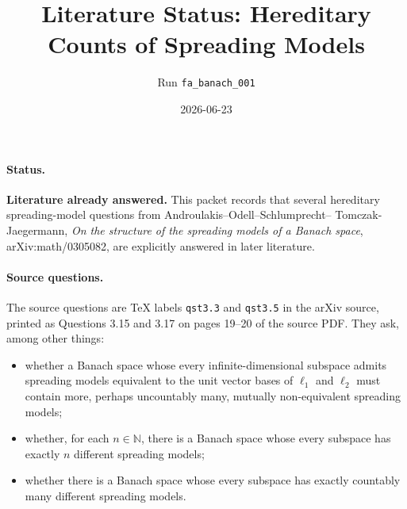 \documentclass[11pt]{article}
\title{Literature Status: Hereditary Counts of Spreading Models}
\author{Run \texttt{fa\_banach\_001}}
\date{2026-06-23}
\begin{document}
\sloppy
\maketitle

\paragraph{Status.}
\textbf{Literature already answered.} This packet records that several
hereditary spreading-model questions from Androulakis--Odell--Schlumprecht--
Tomczak-Jaegermann, \emph{On the structure of the spreading models of a
Banach space}, arXiv:math/0305082, are explicitly answered in later
literature.

\paragraph{Source questions.}
The source questions are TeX labels \texttt{qst3.3} and \texttt{qst3.5} in
the arXiv source, printed as Questions 3.15 and 3.17 on pages 19--20 of the
source PDF. They ask, among other things:
\begin{itemize}
\item whether a Banach space whose every infinite-dimensional subspace admits
spreading models equivalent to the unit vector bases of \(\ell_1\) and
\(\ell_2\) must contain more, perhaps uncountably many, mutually
non-equivalent spreading models;
\item whether, for each \(n\in\mathbb N\), there is a Banach space whose every
subspace has exactly \(n\) different spreading models;
\item whether there is a Banach space whose every subspace has exactly
countably many different spreading models.
\end{itemize}
\end{document}
